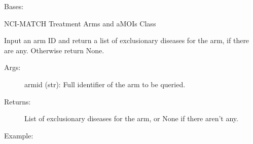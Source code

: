\documentclass[letterpaper,10pt,english]{sphinxmanual}
\begin{document}
\begin{fulllineitems}
\label{\detokenize{matchbox_api_utils:matchbox_api_utils.TreatmentArms}}
Bases: 

NCI-MATCH Treatment Arms and aMOIs Class

\begin{fulllineitems}
\label{\detokenize{matchbox_api_utils:matchbox_api_utils.TreatmentArms.get_exclusion_disease}}
Input an arm ID and return a list of exclusionary diseases for the arm, if there are any. Otherwise
return None.
\begin{description}
\item[{Args:}] \leavevmode
armid (str): Full identifier of the arm to be queried.

\item[{Returns:}] \leavevmode
List of exclusionary diseases for the arm, or None if there aren’t any.

\item[{Example:}] \leavevmode
\begin{sphinxVerbatim}[commandchars=\\\{\}]
\end{sphinxVerbatim}

\begin{sphinxVerbatim}[commandchars=\\\{\}]
\end{sphinxVerbatim}

\end{description}

\end{fulllineitems}



\end{fulllineitems}
\end{document}
